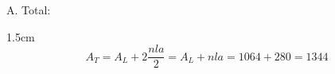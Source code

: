 \documentclass[12pt,examen,answers]{repaso_layout}
\begin{document}
\begin{questions}
{\begin{parts}
\begin{minipage}{.75\linewidth}
				A. Total:\\[-2em]
				\begin{solutionbox}{1.5cm}
					\[A_T=A_L+2\dfrac{nla}{2}=A_L+nla=1064+280=1344\]
				\end{solutionbox}
			\end{minipage}
		\end{parts}
	}










\end{questions}
\end{document}
